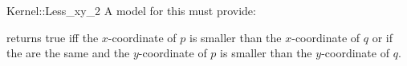 \begin{ccRefFunctionObjectConcept}{Kernel::Less_xy_2}
A model for this must provide:


{returns true iff the $x$-coordinate of $p$ is smaller than the
$x$-coordinate of $q$ or if the are the same and 
the $y$-coordinate of $p$ is smaller than the $y$-coordinate of $q$.}

\ccIsModel{}

\end{ccRefFunctionObjectConcept}
